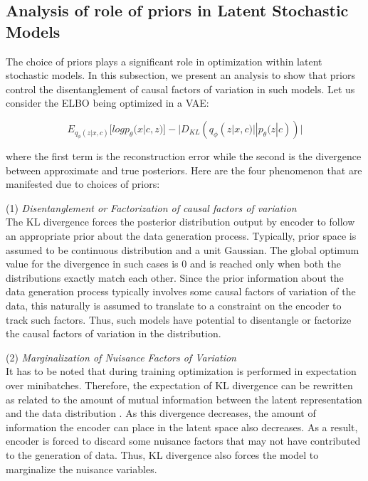 \subsection{Analysis of role of priors in Latent Stochastic Models}
\label{analysis}



The choice of priors plays a significant role in optimization within latent stochastic models. In this subsection, we present an analysis to show that priors control the disentanglement of causal factors of variation in such models. Let us consider the ELBO being optimized in a VAE:

\begin{equation}
E_{q_{\phi}(z|x,c)}[log p_{\theta} (x|c,z)] -  |D_{KL}(q_{\phi} (z|x,c) || p_{\theta} (z|c))| 
\end{equation}

where the first term is the reconstruction error while the second is the divergence between approximate and true posteriors. Here are the four phenomenon that are manifested due to choices of priors:

(1) \textit{Disentanglement or Factorization of causal factors of variation} \\
The KL divergence forces the posterior distribution output by encoder to follow an appropriate prior about the data generation process. Typically, prior space is assumed to be continuous distribution and a unit Gaussian. The global optimum value for the divergence in such cases is 0 and is reached only when both the distributions exactly match each other. Since the prior information about the data generation process typically involves some causal factors of variation of the data, this naturally is assumed to translate to a constraint on the encoder to track such factors. Thus, such models have potential to disentangle or factorize the causal factors of variation in the distribution.

(2) \textit{Marginalization of Nuisance Factors of Variation} \\
It has to be noted that during training optimization is performed in expectation over minibatches. Therefore, the expectation of KL divergence can be rewritten as related to the amount of mutual information between the latent representation and the data distribution \citep{pixelgan_autoencoder}. As this divergence decreases, the amount of information the encoder can place in the latent space also decreases. As a result, encoder is forced to discard some nuisance factors that may not have contributed to the generation of data. Thus, KL divergence also forces the model to marginalize the nuisance variables.

